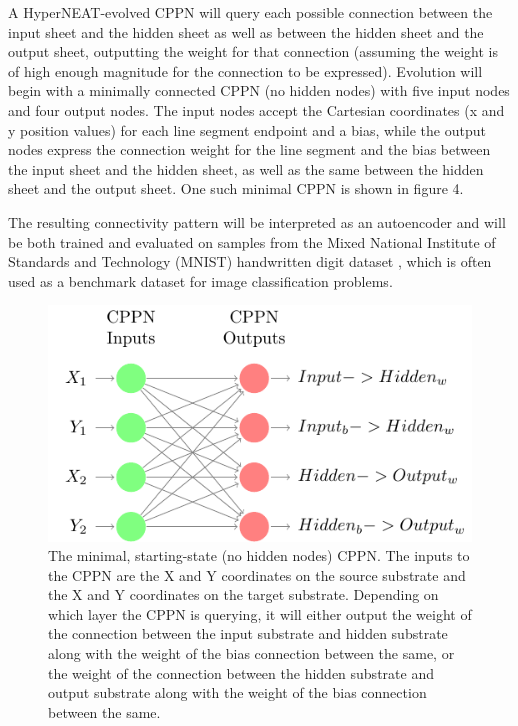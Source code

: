 \documentclass{acm_proc_article-sp}
\begin{document}
A HyperNEAT-evolved CPPN will query each possible connection between the input sheet and the hidden sheet as well as between the hidden sheet and the output sheet, outputting the weight for that connection (assuming the weight is of high enough magnitude for the connection to be expressed).  Evolution will begin with a minimally connected CPPN (no hidden nodes) with five input nodes and four output nodes.  The input nodes accept the Cartesian coordinates (x and y position values) for each line segment endpoint and a bias, while the output nodes express the connection weight for the line segment and the bias between the input sheet and the hidden sheet, as well as the same between the hidden sheet and the output sheet.  One such minimal CPPN is shown in figure 4.

The resulting connectivity pattern will be interpreted as an autoencoder and will be both trained and evaluated on samples from the Mixed National Institute of Standards and Technology (MNIST) handwritten digit dataset \cite{Author}, which is often used as a benchmark dataset for image classification problems.

\begin{figure}[h]
\caption{The minimal, starting-state (no hidden nodes) CPPN.  The inputs to the CPPN are the X and Y coordinates on the source substrate and the X and Y coordinates on the target substrate.  Depending on which layer the CPPN is querying, it will either output the weight of the connection between the input substrate and hidden substrate along with the weight of the bias connection between the same, or the weight of the connection between the hidden substrate and output substrate along with the weight of the bias connection between the same.}
\centering
\includegraphics[scale=0.8]{MinimalCppn/MinimalCppn}
\end{figure}
\end{document}
